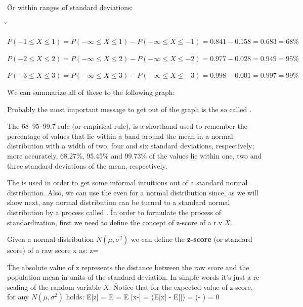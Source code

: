 \v

Or within ranges of standard deviations:

\v

\bit
\item $P(-1 \leq X \leq 1) = P(-\infty \leq X \leq 1) - P(-\infty \leq X \leq -1) = 0.841 - 0.158 = 0.683 = 68\%$
\item $P(-2 \leq X \leq 2) = P(-\infty \leq X \leq 2) - P(-\infty \leq X \leq -2) = 0.977 - 0.028 = 0.949 = 95\%$
\item $P(-3 \leq X \leq 3) = P(-\infty \leq X \leq 3) - P(-\infty \leq X \leq -3) = 0.998 - 0.001 = 0.997 = 99\%$
\eit

\v

We can summarize all of these to the following graph:


Probably the most important message to get out of the graph is the so called .

\bt[68–95–99.7 Rule]
The 68–95–99.7 rule (or empirical rule), is a shorthand used to remember the percentage of values that lie within a
band around the mean in a normal distribution with a width of two, four and six standard deviations, respectively;
more accurately, 68.27\%, 95.45\% and 99.73\% of the values lie within one, two and three standard deviations of the
mean, respectively.
\et

The  is used in order to get some informal intuitions out of a standard normal distribution.
Also, we can use the  even for a normal distribution since, as we will show next, any normal
distribution can be turned to a standard normal distribution by a process called . \v

In order to formulate the process of standardization, first we need to define the concept of z-score of a r.v $X$.

\bd[Z-Score]
Given a normal distribution $N(\mu, \sigma^2)$ we can define the \textbf{z-score} (or standard score) of a raw score
x as:
\bse
z= 
\ese
\ed

\v

The absolute value of z represents the distance between the raw score and the population mean in units of the
standard deviation. In simple words it's just a re-scaling of the random variable $X$. \v

Notice that for the expected value of z-score, for any $N(\mu, \sigma^2)$ holds:
\bse
E[z] = E  =  E [x-\mu] =  (E[x] - E[\mu])
=  (\mu - \mu) = 0
\ese

